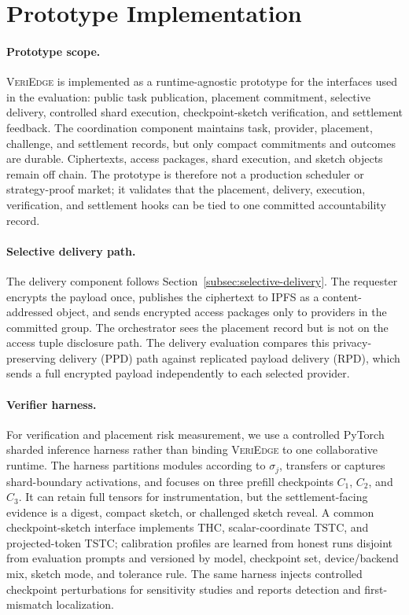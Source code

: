 \documentclass[sigplan,screen,review,anonymous]{acmart}
\newcommand{\system}{\textsc{VeriEdge}\xspace}
\begin{document}
\section{Prototype Implementation}
\label{sec:implementation}

\paragraph{Prototype scope.}
\system is implemented as a runtime-agnostic prototype for the interfaces
used in the evaluation: public task publication, placement commitment,
selective delivery, controlled shard execution, checkpoint-sketch
verification, and settlement feedback. The coordination component maintains
task, provider, placement, challenge, and settlement records, but only compact
commitments and outcomes are durable. Ciphertexts, access packages, shard
execution, and sketch objects remain off chain. The prototype is therefore
not a production scheduler or strategy-proof market; it validates that the
placement, delivery, execution, verification, and settlement hooks can be tied
to one committed accountability record.

\paragraph{Selective delivery path.}
The delivery component follows Section~\ref{subsec:selective-delivery}. The
requester encrypts the payload
once, publishes the ciphertext to IPFS as a content-addressed object, and
sends encrypted access packages only to providers in the committed
group. The orchestrator sees the placement record but is not on the access
tuple disclosure path. The delivery evaluation compares this
privacy-preserving delivery (PPD) path against replicated payload delivery
(RPD), which sends a full encrypted payload independently to each selected
provider.

\paragraph{Verifier harness.}
For verification and placement risk measurement, we use a controlled PyTorch
sharded inference harness rather than binding \system to one collaborative
runtime. The harness partitions modules according to \(\sigma_j\), transfers
or captures shard-boundary activations, and focuses on three prefill
checkpoints \(C_1\), \(C_2\), and \(C_3\). It can retain full tensors for instrumentation, but
the settlement-facing evidence is a digest, compact sketch, or challenged
sketch reveal. A common checkpoint-sketch interface implements THC,
scalar-coordinate TSTC, and projected-token TSTC; calibration profiles are
learned from honest runs disjoint from evaluation prompts and versioned by
model, checkpoint set, device/backend mix, sketch mode, and tolerance rule.
The same harness injects controlled checkpoint perturbations for sensitivity
studies and reports detection and first-mismatch localization.
\end{document}
